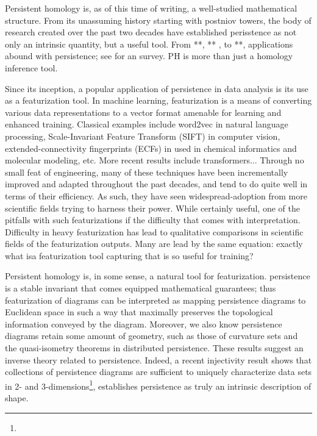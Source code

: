 Persistent homology is, as of this time of writing, a well-studied mathematical structure. From its unassuming history starting with postniov towers, the body of research created over the past two decades have established perisstence as not only an intrinsic quantity, but a useful tool. 
From **, ** , to **, applications abound with persistence; see for an survey. PH is more than just a homology inference tool.  

Since its inception, a popular application of persistence in data analysis is its use as a featurization tool. 
In machine learning, featurization is a means of converting various data representations to a vector format amenable for learning and enhanced training. Classical examples include word2vec in natural language processing, Scale-Invariant Feature Transform (SIFT) in computer vision, extended-connectivity fingerprints (ECFs) in used in chemical informatics and molecular modeling, etc. 
More recent results include transformers... 
Through no small feat of engineering, many of these techniques have been incrementally improved and adapted throughout the past decades, and tend to do quite well in terms of their efficiency. As such, they have seen widespread-adoption from more scientific fields trying to harness their power. 
While certainly useful, one of the pitfalls with such featurizations if the difficulty that comes with interpretation. 
Difficulty in heavy featurization has lead to qualitative comparisons in scientific fields of the featurization outputs. Many are lead by the same equation: exactly what isa featurization tool capturing that is so useful for training?

Persistent homology is, in some sense, a natural tool for featurization. persistence is a stable invariant that comes equipped mathematical guarantees; thus featurization of diagrams can be interpreted as mapping persistence diagrams to Euclidean space in such a way that maximally preserves the topological information conveyed by the diagram. 
Moreover, we also know persistence diagrams retain some amount of geometry, such as those of curvature sets and the quasi-isometry theorems in distributed persistence. These results suggest an inverse theory related to persistence. 
Indeed, a recent injectivity result shows that collections of persistence diagrams are sufficient to uniquely characterize data sets in 2- and 3-dimensions\footnote{}, establishes persistence as truly an intrinsic description of shape. 
